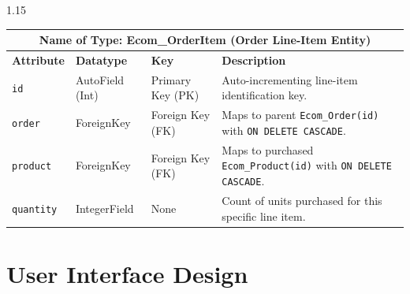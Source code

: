 \documentclass[12pt,a4paper]{article}
\begin{document}
{\begin{spacing}{1.15}
\vspace{0.06in}

\begin{center}
\renewcommand{\arraystretch}{1.15}
\fontsize{9}{12}\selectfont
\begin{tabular}{|p{1.4in}|p{1.1in}|p{0.8in}|p{2.9in}|}
\hline
\multicolumn{4}{|c|}{\textbf{\fontsize{10}{13}\selectfont Name of Type: Ecom\_OrderItem (Order Line-Item Entity)}} \\ \hline
\textbf{Attribute} & \textbf{Datatype} & \textbf{Key} & \textbf{Description} \\ \hline
\texttt{id} & AutoField (Int) & Primary Key (PK) & Auto-incrementing line-item identification key. \\ \hline
\texttt{order} & ForeignKey & Foreign Key (FK) & Maps to parent \texttt{Ecom\_Order(id)} with \texttt{ON DELETE CASCADE}. \\ \hline
\texttt{product} & ForeignKey & Foreign Key (FK) & Maps to purchased \texttt{Ecom\_Product(id)} with \texttt{ON DELETE CASCADE}. \\ \hline
\texttt{quantity} & IntegerField & None & Count of units purchased for this specific line item. \\ \hline
\end{tabular}
\end{center}

\end{spacing}
}

\vfill

\newpage



\section{User Interface Design}

\vspace{0.06in}
\end{document}
